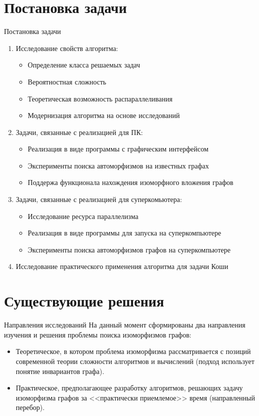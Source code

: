 \documentclass{beamer}
\begin{document}
\section{Постановка задачи}
\begin{frame}{Постановка задачи}
\small
\begin{enumerate}
\item Исследование свойств алгоритма:
\begin{itemize}
\scriptsize
\item Определение класса решаемых задач
\item Вероятностная сложность
\item Теоретическая возможность распараллеливания
\item Модернизация алгоритма на основе исследований
\end{itemize}
\item Задачи, связанные с реализацией для ПК:
\begin{itemize}
\scriptsize
\item Реализация в виде программы с графическим интерфейсом
\item Эксперименты поиска автоморфизмов на известных графах
\item Поддержа функционала нахождения изоморфного вложения графов
\end{itemize}
\item Задачи, связанные с реализацией для суперкомьютера:
\begin{itemize}
\scriptsize
\item Исследование ресурса параллелизма
\item Реализация в виде программы для запуска на суперкомпьютере
\item Эксперименты поиска автоморфизмов графов на суперкомпьютере
\end{itemize}
\item Исследование практического применения алгоритма для задачи Коши
\end{enumerate}
\end{frame} 


\section{Существующие решения}
\begin{frame}{Направления исследований}
На данный момент сформированы два направления изучения и решения проблемы поиска изоморфизмов графов:
\begin{itemize}
\item Теоретическое, в котором проблема изоморфизма рассматривается с позиций современной теории сложности алгоритмов и вычислений (подход использует понятие инвариантов графа).

\item Практическое, предполагающее разработку алгоритмов, решающих задачу изоморфизма графов за <<практически приемлемое>> время (направленный перебор).
\end{itemize}
\end{frame}
\end{document}
